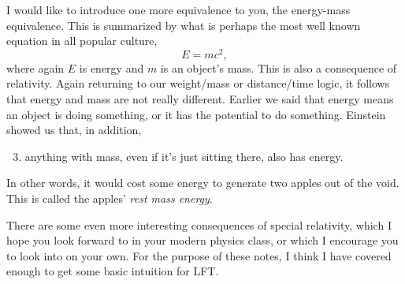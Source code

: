 I would like to introduce one more equivalence to you, the energy-mass
equivalence. This is summarized by what is perhaps the most well known equation
in all popular culture,
\begin{equation}\label{eq:emc2}
E=mc^2,
\end{equation}
where again $E$ is energy and $m$ is an object's mass.
This is also a consequence of relativity. Again returning to our weight/mass or
distance/time logic, it follows that energy and mass are not really different.
Earlier we said that energy means an object is doing something, or it has the
potential to do something. Einstein showed us that, in addition,
\begin{enumerate}
\setcounter{enumi}{2}
\item anything with mass, even if it’s just sitting there, also has energy.
\end{enumerate}
In other words, it would cost some energy to generate two apples out of the
void. This is called the apples’ {\it rest mass energy}.

There are some even more interesting consequences of special relativity, which I
hope you look forward to in your modern physics class, or which I encourage you
to look into on your own. For the purpose of these notes, I think I have covered
enough to get some basic intuition for LFT.


